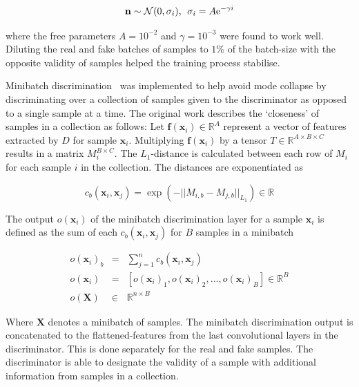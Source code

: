 \documentclass[twocolumn]{article}
\numberwithin{equation}{section}
\begin{document}
\begin{equation}
    \mathbf{n} \sim \mathcal{N}(0,\sigma_i), \: \: \sigma_i = A \textup{e}^{-\gamma i}
\end{equation}

where the free parameters $A=10^{-2}$ and $\gamma=10^{-3}$ were found to work well. Diluting the real and fake batches of 
samples to $1\%$ of the batch-size with the opposite validity of samples helped the training process stabilise.

Minibatch discrimination~\cite{gantricks_sali} was implemented to help avoid mode collapse by discriminating over a 
collection of samples given to the discriminator as opposed to a single sample at a time. The original work describes 
the `closeness' of samples in a collection as follows: Let $\mathbf{f}(\bm{x}_i) \in \mathbb{R}^A$ represent a vector of 
features extracted by $D$ for sample $\mathbf{x}_i$. Multiplying $\mathbf{f}(\bm{x}_i)$ by a tensor $T \in \mathbb{R}^{A\times 
B\times C}$ results in a matrix $M_i^{B\times C}$. The $L_1$-distance is calculated between each row of $M_i$ for each sample 
$i$ in the collection. The distances are exponentiated as

\begin{equation}
    c_b(\mathbf{x}_i, \mathbf{x}_j) = \exp({- ||M_{i,b} - M_{j,b}||_{L_1}}) \in \mathbb{R} \nonumber
\end{equation}

The output $o(\mathbf{x}_i)$ of the minibatch discrimination layer for a sample $\mathbf{x}_i$ is defined as the sum of 
each $c_b(\mathbf{x}_i, \mathbf{x}_j)$ for $B$ samples in a minibatch

\begin{eqnarray}
    o(\mathbf{x}_i)_b &=& \sum_{j=1}^n c_b(\mathbf{x}_i, \mathbf{x}_j) \nonumber \\
    o(\mathbf{x}_i) &=& [o(\mathbf{x}_i)_1, o(\mathbf{x}_i)_2, ..., o(\mathbf{x}_i)_B] \in \mathbb{R}^B \nonumber\\
    o(\mathbf{X}) &\in& \mathbb{R}^{n \times B} \nonumber
\end{eqnarray}

Where $\mathbf{X}$ denotes a minibatch of samples. The minibatch discrimination output is concatenated to the 
flattened-features from the last convolutional layers in the discriminator. This is done separately for the real and 
fake samples. The discriminator is able to designate the validity of a sample with additional information from samples 
in a collection.
\end{document}
